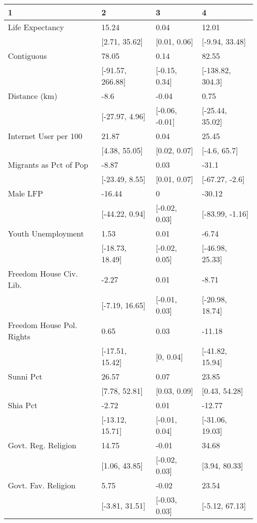 \begin{table}[ht]
\centering
\begin{tabular}{llll}
  \hline
1 & 2 & 3 & 4 \\ 
  \hline
Life Expectancy & 15.24 & 0.04 & 12.01 \\ 
   & [2.71, 35.62] & [0.01, 0.06] & [-9.94, 33.48] \\ 
  Contiguous & 78.05 & 0.14 & 82.55 \\ 
   & [-91.57, 266.88] & [-0.15, 0.34] & [-138.82, 304.3] \\ 
  Distance (km) & -8.6 & -0.04 & 0.75 \\ 
   & [-27.97, 4.96] & [-0.06, -0.01] & [-25.44, 35.02] \\ 
  Internet User per 100 & 21.87 & 0.04 & 25.45 \\ 
   & [4.38, 55.05] & [0.02, 0.07] & [-4.6, 65.7] \\ 
  Migrants as Pct of Pop & -8.87 & 0.03 & -31.1 \\ 
   & [-23.49, 8.55] & [0.01, 0.07] & [-67.27, -2.6] \\ 
  Male LFP & -16.44 & 0 & -30.12 \\ 
   & [-44.22, 0.94] & [-0.02, 0.03] & [-83.99, -1.16] \\ 
  Youth Unemployment & 1.53 & 0.01 & -6.74 \\ 
   & [-18.73, 18.49] & [-0.02, 0.05] & [-46.98, 25.33] \\ 
  Freedom House Civ. Lib. & -2.27 & 0.01 & -8.71 \\ 
   & [-7.19, 16.65] & [-0.01, 0.03] & [-20.98, 18.74] \\ 
  Freedom House Pol. Rights & 0.65 & 0.03 & -11.18 \\ 
   & [-17.51, 15.42] & [0, 0.04] & [-41.82, 15.94] \\ 
  Sunni Pct & 26.57 & 0.07 & 23.85 \\ 
   & [7.78, 52.81] & [0.03, 0.09] & [0.43, 54.28] \\ 
  Shia Pct & -2.72 & 0.01 & -12.77 \\ 
   & [-13.12, 15.71] & [-0.01, 0.04] & [-31.06, 19.03] \\ 
  Govt. Reg. Religion & 14.75 & -0.01 & 34.68 \\ 
   & [1.06, 43.85] & [-0.02, 0.03] & [3.94, 80.33] \\ 
  Govt. Fav. Religion & 5.75 & -0.02 & 23.54 \\ 
   & [-3.81, 31.51] & [-0.03, 0.03] & [-5.12, 67.13] \\ 

\end{tabular}
\end{table}
